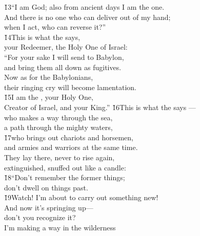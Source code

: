 \begin{poetry}
\poeml \v{13}``I am God; also from ancient days I am the one. \\
\poemll    And there is no one who can deliver out of my hand; \\
\poemlll       when I act, who can reverse it?'' \\
\poeml \v{14}This is what the  says, \\
\poemll    your Redeemer, the Holy One of Israel: \\
\poeml ``For your sake I will send to Babylon, \\
\poemll    and bring them all down as fugitives. \\
\poeml Now as for the Babylonians, \\
\poemll    their ringing cry will become lamentation. \\
\poeml \v{15}I am the , your Holy One, \\
\poemll    Creator of Israel, and your King.''
\poeml \v{16}This is what the  says --- \\
\poemll    who makes a way through the sea, \\
\poemlll       a path through the mighty waters, \\
\poeml \v{17}who brings out chariots and horsemen, \\
\poemll    and armies and warriors at the same time. \\
\poeml They lay there, never to rise again, \\
\poemll    extinguished, snuffed out like a candle: \\
\poeml \v{18}``Don't remember the former things; \\
\poemll    don't dwell on things past. \\
\poeml \v{19}Watch! I'm about to carry out something new! \\
\poemll    And now it's springing up--- \\
\poemlll       don't you recognize it? \\
\poeml I'm making a way in the wilderness \\

\end{poetry}
